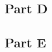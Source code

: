 \documentclass[a4paper]{article}
\begin{document}
\subsection{Part D}


\subsection{Part E}

\end{document}
